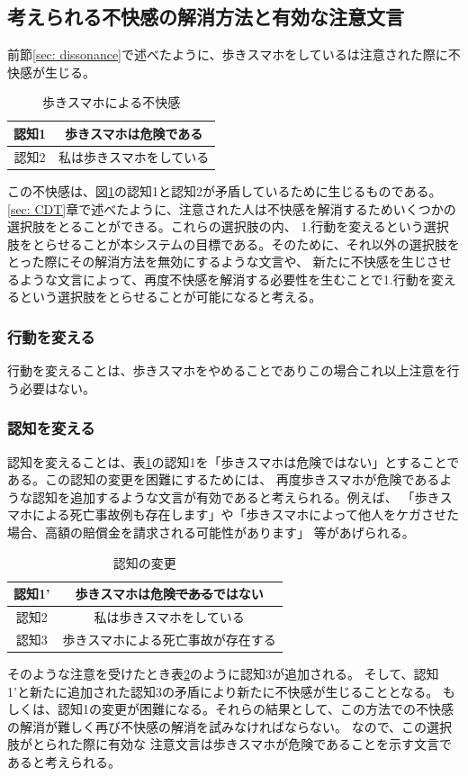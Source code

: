 \documentclass{kuisthesis}
\begin{document}
\subsection{考えられる不快感の解消方法と有効な注意文言}
\label{sec: dissonance2}
前節\ref{sec: dissonance}で述べたように、歩きスマホをしているは注意された際に不快感が生じる。
\begin{table}[h]
  \centering
  
  
  \begin{tabular}{c|c}

      認知1 & 歩きスマホは危険である  \\ \hline
      認知2 & 私は歩きスマホをしている \\ 
  \end{tabular}
  \caption{歩きスマホによる不快感}
  \label{fig: UsingPhone}
\end{table}
この不快感は、図\ref{fig: UsingPhone}の認知1と認知2が矛盾しているために生じるものである。
\ref{sec: CDT}章で述べたように、注意された人は不快感を解消するためいくつかの選択肢をとることができる。これらの選択肢の内、
1.行動を変えるという選択肢をとらせることが本システムの目標である。そのために、それ以外の選択肢をとった際にその解消方法を無効にするような文言や、
新たに不快感を生じさせるような文言によって、再度不快感を解消する必要性を生むことで1.行動を変えるという選択肢をとらせることが可能になると考える。

\subsubsection{行動を変える}
行動を変えることは、歩きスマホをやめることでありこの場合これ以上注意を行う必要はない。
\subsubsection{認知を変える}
認知を変えることは、表\ref{fig: UsingPhone}の認知1を「歩きスマホは危険ではない」とすることである。この認知の変更を困難にするためには、
再度歩きスマホが危険であるような認知を追加するような文言が有効であると考えられる。例えば、
「歩きスマホによる死亡事故例も存在します」や「歩きスマホによって他人をケガさせた場合、高額の賠償金を請求される可能性があります」
等があげられる。
\begin{table}[h]
  \centering
  
  
  \begin{tabular}{c|c}
      認知1' & 歩きスマホは危険\sout{である}ではない \\ \hline
      認知2 & 私は歩きスマホをしている \\ \hline
      認知3 & 歩きスマホによる死亡事故が存在する \\
  \end{tabular}
  \caption{認知の変更}
  \label{fig: AvoidDissonanceRevise}
\end{table}
そのような注意を受けたとき表\ref{fig: AvoidDissonanceRevise}のように認知3が追加される。
そして、認知1'と新たに追加された認知3の矛盾により新たに不快感が生じることとなる。
もしくは、認知1の変更が困難になる。それらの結果として、この方法での不快感の解消が難しく再び不快感の解消を試みなければならない。
なので、この選択肢がとられた際に有効な
注意文言は歩きスマホが危険であることを示す文言であると考えられる。
\end{document}
